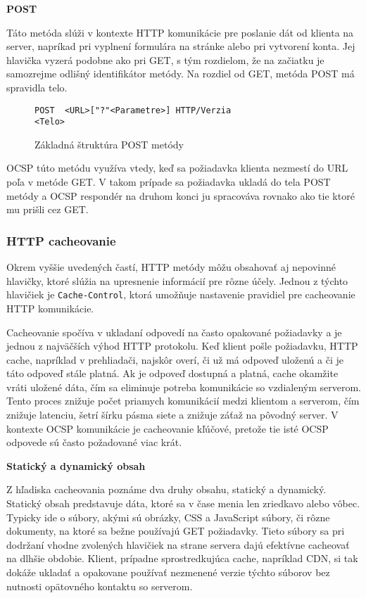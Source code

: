 \documentclass[12pt, twoside]{book}
\newcommand{\subsubsubsection}[1]{%
  \vspace{0.2em}  
  \textbf{#1} \\[0.2em]
  \hspace*{\parindent}
}
\begin{document}
\subsubsubsection{POST}
Táto metóda slúži v kontexte HTTP komunikácie pre poslanie dát od klienta na server, napríkad pri vyplnení formulára na stránke alebo pri vytvorení konta. Jej hlavička vyzerá podobne ako pri GET, s tým rozdielom, že na začiatku je samozrejme odlišný identifikátor metódy. Na rozdiel od GET, metóda POST má spravidla telo.\cite{rfc9110}

\begin{figure}[H]
\begin{lstlisting}
POST  <URL>["?"<Parametre>] HTTP/Verzia
<Telo>
\end{lstlisting}
\caption{Základná štruktúra POST metódy}
\end{figure}

OCSP túto metódu využíva vtedy, keď sa požiadavka klienta nezmestí do URL poľa v metóde GET. V takom prípade sa požiadavka ukladá do tela POST metódy a OCSP  respondér na druhom konci ju spracováva rovnako ako tie ktoré mu prišli cez GET.\cite{rfc6960}

\subsubsection{HTTP cacheovanie}
Okrem vyššie uvedených častí, HTTP metódy môžu obsahovať aj nepovinné hlavičky, ktoré slúžia na upresnenie informácií pre rôzne účely. Jednou z týchto hlavičiek je \texttt{Cache-Control}, ktorá umožňuje nastavenie pravidiel pre cacheovanie HTTP komunikácie.\cite{rfc9110}

Cacheovanie spočíva v ukladaní odpovedí na často opakované požiadavky a je jednou z najväčších výhod HTTP protokolu. Keď klient pošle požiadavku, HTTP cache, napríklad v prehliadači, najskôr overí, či už má odpoveď uloženú a či je táto odpoveď stále platná. Ak je odpoveď dostupná a platná, cache okamžite vráti uložené dáta, čím sa eliminuje potreba komunikácie so vzdialeným serverom.
Tento proces znižuje počet priamych komunikácií medzi klientom a serverom, čím znižuje latenciu, šetrí šírku pásma siete a znižuje záťaž na pôvodný server. V kontexte OCSP komunikácie je cacheovanie kľúčové, pretože tie isté OCSP odpovede sú často požadované viac krát.

\subsubsubsection{Statický a dynamický obsah}
Z hľadiska cacheovania poznáme dva druhy obsahu, statický a dynamický. Statický obsah predstavuje dáta, ktoré sa v čase menia len zriedkavo alebo vôbec. Typicky ide o súbory, akými sú obrázky, CSS a JavaScript súbory, či rôzne dokumenty, na ktoré sa bežne používajú GET požiadavky. Tieto súbory sa pri dodržaní vhodne zvolených hlavičiek na strane servera dajú efektívne cacheovať na dlhšie obdobie. Klient, prípadne sprostredkujúca cache, napríklad CDN, si tak dokáže ukladať a opakovane používať nezmenené verzie týchto súborov bez nutnosti opätovného kontaktu so serverom.\cite{rfc9110}
\end{document}
